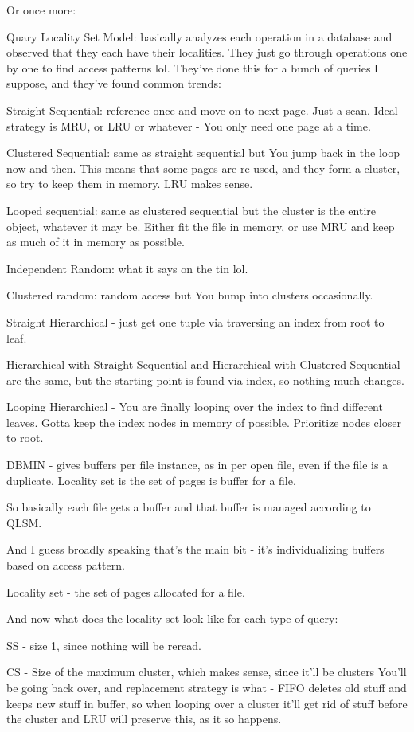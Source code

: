 \documentclass{article}
\begin{document}
	Or once more:
	
	Quary Locality Set Model: basically analyzes each operation in a database and observed that they each have their localities. They just go through operations one by one to find access patterns lol. They've done this for a bunch of queries I suppose, and they've found common trends:
	
	Straight Sequential: reference once and move on to next page. Just a scan. Ideal strategy is MRU, or LRU or whatever - You only need one page at a time.
	
	Clustered Sequential: same as straight sequential but You jump back in the loop now and then. This means that some pages are re-used, and they form a cluster, so try to keep them in memory. LRU makes sense.
	
	Looped sequential: same as clustered sequential but the cluster is the entire object, whatever it may be. Either fit the file in memory, or use MRU and keep as much of it in memory as possible.
	
	Independent Random: what it says on the tin lol.
	
	Clustered random: random access but You bump into clusters occasionally.
	
	Straight Hierarchical - just get one tuple via traversing an index from root to leaf.
	
	Hierarchical with Straight Sequential and Hierarchical with Clustered Sequential are the same, but the starting point is found via index, so nothing much changes.
	
	Looping Hierarchical - You are finally looping over the index to find different leaves. Gotta keep the index nodes in memory of possible. Prioritize nodes closer to root.
	
	DBMIN - gives buffers per file instance, as in per open file, even if the file is a duplicate. Locality set is the set of pages is buffer for a file.
	
	So basically each file gets a buffer and that buffer is managed according to QLSM.
	
	And I guess broadly speaking that's the main bit - it's individualizing buffers based on access pattern.
	
	Locality set - the set of pages allocated for a file.
	
	And now what does the locality set look like for each type of query:
	
	SS - size 1, since nothing will be reread.
	
	CS - Size of the maximum cluster, which makes sense, since it'll be clusters You'll be going back over, and replacement strategy is what - FIFO deletes old stuff and keeps new stuff in buffer, so when looping over a cluster it'll get rid of stuff before the cluster and LRU will preserve this, as it so happens.
	
\end{document}
